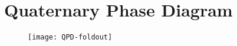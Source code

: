 
\chapter{Quaternary Phase Diagram} %

\label{AppendixC} %


\begin{figure}
	\texttt{[image: QPD-foldout]}
\end{figure}